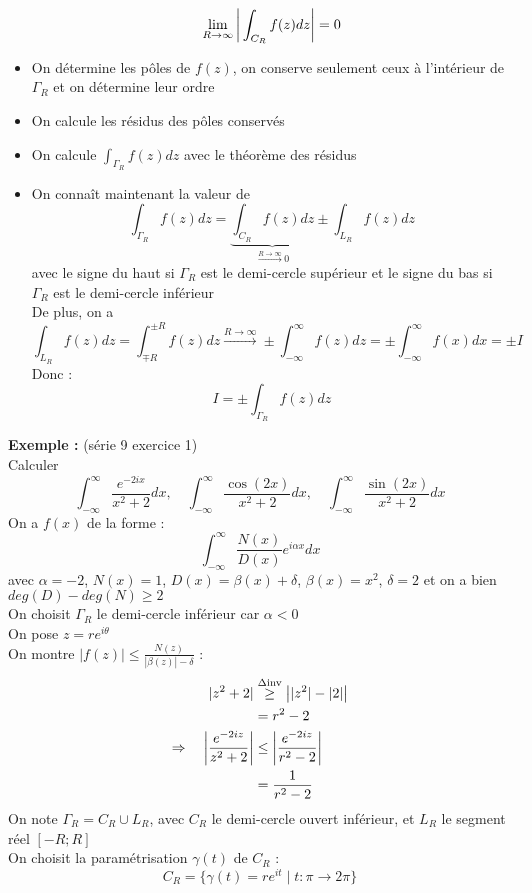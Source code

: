 \begin{itemize}
    $$\lim_{R \to \infty}\bigg{|}\int_{C_R} f(z)dz\bigg{|} = 0$$
    \item On détermine les pôles de $f(z)$, on conserve seulement ceux à l'intérieur de $\Gamma_R$ et on détermine leur ordre
    \item On calcule les résidus des pôles conservés
    \item On calcule $\int_{\Gamma_R} f(z) dz$ avec le théorème des résidus
    \item On connaît maintenant la valeur de
    $$\int_{\Gamma_R} f(z) dz = \underbrace{\int_{C_R} f(z) dz}_{\overset{R \to \infty}{\longrightarrow} 0} \pm \int_{L_R} f(z) dz$$
    avec le signe du haut si $\Gamma_R$ est le demi-cercle supérieur et le signe du bas si $\Gamma_R$ est le demi-cercle inférieur \\
    De plus, on a
    $$\int_{L_R} f(z) dz = \int_{\mp R}^{\pm R} f(z) dz \overset{R \to \infty}{\longrightarrow} \pm \int_{-\infty}^{\infty} f(z) dz = \pm \int_{-\infty}^{\infty} f(x) dx = \pm I$$
    Donc :
    $$I = \pm \int_{\Gamma_R} f(z) dz$$
\end{itemize}
\textbf{Exemple :} (série 9 exercice 1) \\
Calculer
$$\int_{-\infty}^{\infty} \frac{e^{-2ix}}{x^2+2}dx, \quad \int_{-\infty}^{\infty} \frac{\cos(2x)}{x^2+2}dx, \quad \int_{-\infty}^{\infty} \frac{\sin(2x)}{x^2+2}dx$$
On a $f(x)$ de la forme :
$$\int_{-\infty}^{\infty}\frac{N(x)}{D(x)}e^{i\alpha x} dx$$
avec $\alpha = -2$, $N(x) = 1$, $D(x) = \beta(x) + \delta$, $\beta(x) = x^2$, $\delta = 2$ et on a bien $deg(D)-deg(N) \geq 2$ \\
On choisit $\Gamma_R$ le demi-cercle inférieur car $\alpha < 0$ \\
On pose $z = re^{i\theta}$ \\
On montre $|f(z)| \leq \frac{N(z)}{|\beta(z)| - \delta}$ :
\begin{align*}
    |z^2+2| &\overset{\Delta\text{inv}}{\geq} \big{|} |z^2|-|2| \big{|} \\
    &= r^2 - 2 \\
    \Rightarrow \quad \bigg{|} \frac{e^{-2iz}}{z^2 + 2} \bigg{|} &\leq \bigg{|} \frac{e^{-2iz}}{r^2 - 2} \bigg{|} \\
    &= \frac{1}{r^2 - 2}
\end{align*}
On note $\Gamma_R = C_R \cup L_R$, avec $C_R$ le demi-cercle ouvert inférieur, et $L_R$ le segment réel $[-R;R]$ \\
On choisit la paramétrisation $\gamma(t)$ de $C_R$ :
$$C_R = \{\gamma(t) = re^{it} \mid t : \pi \to 2\pi\}$$
